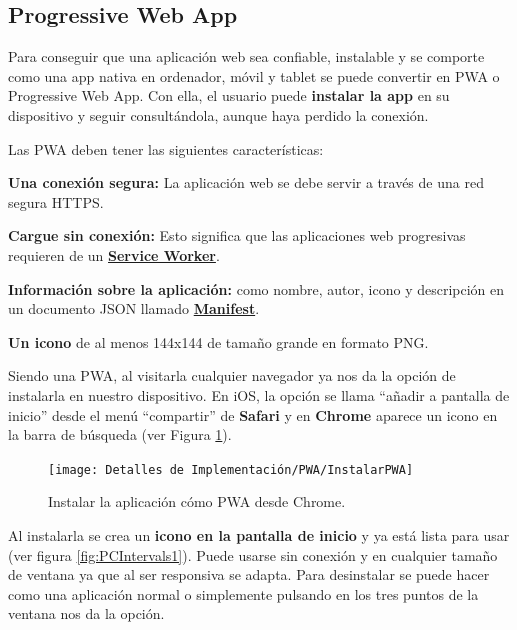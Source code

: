 \documentclass[12pt,twoside,titlepage]{report}
\begin{document}
\subsection{Progressive Web App}

Para conseguir que una aplicación web sea confiable, instalable y se comporte como una app nativa en ordenador, móvil y tablet se puede convertir en PWA o Progressive Web App. Con ella, el usuario puede \textbf{instalar la app} en su dispositivo y seguir consultándola, aunque haya perdido la conexión.
\cite{pwa1}

Las PWA deben tener las siguientes características:

\begin{compactitem}

    \item \textbf{Una conexión segura:} La aplicación web se debe servir a través de una red segura HTTPS.
    \item \textbf{Cargue sin conexión:} Esto significa que las aplicaciones web progresivas requieren de un \hyperref[sec:serviceWorker]{\textbf{Service Worker}}.
    \item \textbf{Información sobre la aplicación:} como nombre, autor, icono y descripción en un documento JSON llamado \hyperref[sec:manifest]{\textbf{Manifest}}.
    \item \textbf{Un icono} de al menos 144x144 de tamaño grande en formato PNG.
\end{compactitem}

Siendo una PWA, al visitarla cualquier navegador ya nos da la opción de instalarla en nuestro dispositivo. En iOS, la opción se llama ``añadir a pantalla de inicio'' desde el menú ``compartir'' de \textbf{Safari} y en \textbf{Chrome} aparece un icono en la barra de búsqueda (ver Figura \ref{fig:InstalarPWA}).

\begin{figure}[H]
    \centering
    \texttt{[image: Detalles de Implementación/PWA/InstalarPWA]}
    \caption{Instalar la aplicación cómo PWA desde Chrome.}
    \label{fig:InstalarPWA}
\end{figure}

Al instalarla se crea un \textbf{icono en la pantalla de inicio} y ya está lista para usar (ver figura \ref{fig:PCIntervals1}). Puede usarse sin conexión y en cualquier tamaño de ventana ya que al ser responsiva se adapta. Para desinstalar se puede hacer como una aplicación normal o simplemente pulsando en los tres puntos de la ventana nos da la opción.

\end{document}
